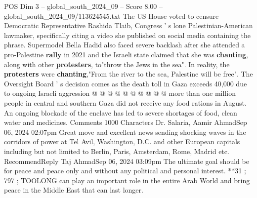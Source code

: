\begin{textsample}{POS Dim 3 – global\_south\_2024\_09 – Score 8.00 – global\_south\_2024\_09/113624545.txt}
The US House voted to censure Democratic Representative Rashida Tlaib, Congress ' s lone Palestinian-American lawmaker, specifically citing a video she published on social media containing the phrase.
Supermodel Bella Hadid also faced severe backlash after she attended a pro-Palestine \textbf{rally} in 2021 and the Israeli state claimed that she was \textbf{chanting}, along with other \textbf{protesters}, to"throw the Jews in the sea".
In reality, the \textbf{protesters} were \textbf{chanting},"From the river to the sea, Palestine will be free".
The Oversight Board ' s decision comes as the death toll in Gaza exceeds 40,000 due to ongoing Israeli aggression @ @ @ @ @ @ @ @ @ @ more than one million people in central and southern Gaza did not receive any food rations in August.
An ongoing blockade of the enclave has led to severe shortages of food, clean water and medicines.
Comments 1000 Characters Dr.
Salaria, Aamir AhmadSep 06, 2024 02:07pm Great move and excellent news sending shocking waves in the corridors of power at Tel Avil, Washington, D.C. and other European capitals including but not limited to Berlin, Paris, Amsterdam, Rome, Madrid etc.
RecommendReply Taj AhmadSep 06, 2024 03:09pm The ultimate goal should be for peace and peace only and without any political and personal interest. **31 ; 797 ; TOOLONG can play an important role in the entire Arab World and bring peace in the Middle East that can last longer.

\end{textsample}
